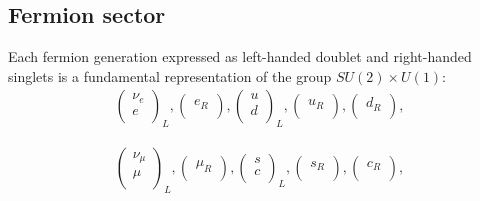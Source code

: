 \subsection{Fermion sector}
Each fermion generation expressed as left-handed doublet and right-handed singlets is a fundamental representation of the group $SU(2) \times U(1)$:
\begin{align}
\begin{pmatrix}
\nu_e  \\
e \\
\end{pmatrix}_L,
\begin{pmatrix}
e_R \\
\end{pmatrix},
\begin{pmatrix}
u \\
d \\
\end{pmatrix}_L,
\begin{pmatrix}
u_R \\
\end{pmatrix},
\begin{pmatrix}
d_R \\
\end{pmatrix},
\end{align}

\begin{align}
\begin{pmatrix}
\nu_\mu  \\
\mu \\
\end{pmatrix}_L,
\begin{pmatrix}
\mu_R \\
\end{pmatrix},
\begin{pmatrix}
s \\
c \\
\end{pmatrix}_L,
\begin{pmatrix}
s_R \\
\end{pmatrix},
\begin{pmatrix}
c_R \\
\end{pmatrix},
\end{align}

